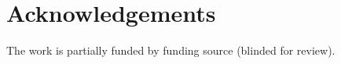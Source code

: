 \documentclass[10pt,conference]{IEEEtran}
\theoremstyle{break}
\theoremstyle{break}
\begin{document}
\section*{Acknowledgements}
The work is partially funded by
funding source (blinded for review).

 \newpage
\balance



%
\medskip
 
\end{document}
